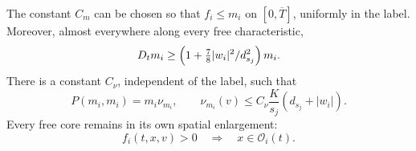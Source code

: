 \begin{lemma}
\label{jet:barrier}
The constant \(C_m\) can be chosen so that \(f_i\le m_i\) on
\([0,\overline T]\), uniformly in the label.  Moreover, almost
everywhere along every free characteristic,
\begin{equation}
 D_t m_i\ge
 \left(1+\tfrac78 |w_i|^2/d_{s_j}^2\right)m_i .
 \label{jet:barrier-derivative}
\end{equation}
There is a constant \(C_\nu\), independent of the label, such that
\begin{equation}
 P(m_i,m_i)=m_i\nu_{m_i},\qquad
 \nu_{m_i}(v)\le C_\nu\frac K{s_j}(d_{s_j}+|w_i|).
 \label{jet:barrier-collision}
\end{equation}
Every free core remains in its own spatial enlargement:
\[
 f_i(t,x,v)>0\quad\Longrightarrow\quad x\in\mathcal O_i(t).
\]
\end{lemma}

